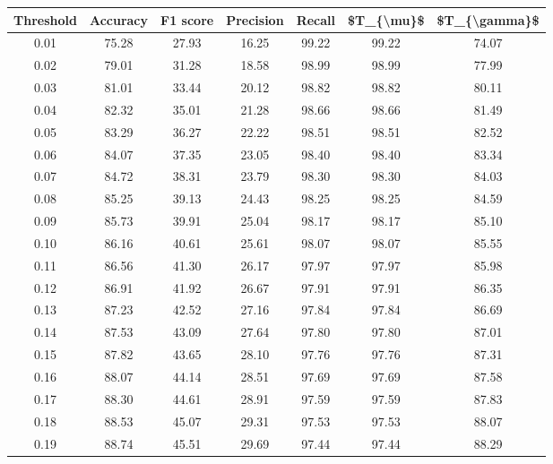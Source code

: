 \begin{tabular}{|c|c|c|c|c|c|c|}
\hline
 Threshold &  Accuracy &  F1 score &  Precision &  Recall &  \$T\_\{\textbackslash mu\}\$ &  \$T\_\{\textbackslash gamma\}\$ \\
\hline
      0.01 &     75.28 &     27.93 &      16.25 &   99.22 &      99.22 &         74.07 \\
      0.02 &     79.01 &     31.28 &      18.58 &   98.99 &      98.99 &         77.99 \\
      0.03 &     81.01 &     33.44 &      20.12 &   98.82 &      98.82 &         80.11 \\
      0.04 &     82.32 &     35.01 &      21.28 &   98.66 &      98.66 &         81.49 \\
      0.05 &     83.29 &     36.27 &      22.22 &   98.51 &      98.51 &         82.52 \\
      0.06 &     84.07 &     37.35 &      23.05 &   98.40 &      98.40 &         83.34 \\
      0.07 &     84.72 &     38.31 &      23.79 &   98.30 &      98.30 &         84.03 \\
      0.08 &     85.25 &     39.13 &      24.43 &   98.25 &      98.25 &         84.59 \\
      0.09 &     85.73 &     39.91 &      25.04 &   98.17 &      98.17 &         85.10 \\
      0.10 &     86.16 &     40.61 &      25.61 &   98.07 &      98.07 &         85.55 \\
      0.11 &     86.56 &     41.30 &      26.17 &   97.97 &      97.97 &         85.98 \\
      0.12 &     86.91 &     41.92 &      26.67 &   97.91 &      97.91 &         86.35 \\
      0.13 &     87.23 &     42.52 &      27.16 &   97.84 &      97.84 &         86.69 \\
      0.14 &     87.53 &     43.09 &      27.64 &   97.80 &      97.80 &         87.01 \\
      0.15 &     87.82 &     43.65 &      28.10 &   97.76 &      97.76 &         87.31 \\
      0.16 &     88.07 &     44.14 &      28.51 &   97.69 &      97.69 &         87.58 \\
      0.17 &     88.30 &     44.61 &      28.91 &   97.59 &      97.59 &         87.83 \\
      0.18 &     88.53 &     45.07 &      29.31 &   97.53 &      97.53 &         88.07 \\
      0.19 &     88.74 &     45.51 &      29.69 &   97.44 &      97.44 &         88.29 \\

\end{tabular}
